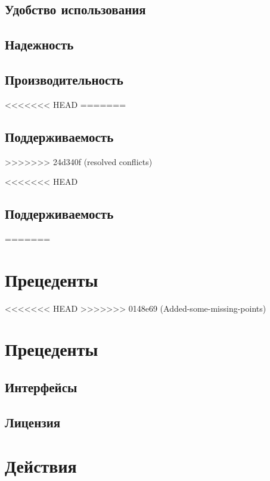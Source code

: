 \documentclass{article}
\begin{document}
\subsection{Удобство использования}


\subsection{Надежность}


\subsection{Производительность}

<<<<<<< HEAD
=======

\subsection{Поддерживаемость}

>>>>>>> 24d340f (resolved conflicts)

<<<<<<< HEAD
\subsection{Поддерживаемость}

=======
\section{Прецеденты}
<<<<<<< HEAD
>>>>>>> 0148e69 (Added-some-missing-points)

\section{Прецеденты}
\subsection{Интерфейсы}


\subsection{Лицензия}


\section{Действия}

\end{document}
